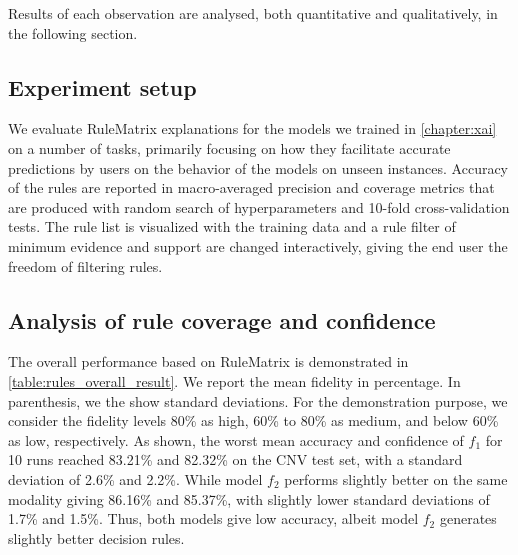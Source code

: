 \hspace*{3.5mm} Results of each observation are analysed, both quantitative and qualitatively, in the following section.

\subsection{Experiment setup}
We evaluate RuleMatrix explanations for the models we trained in \cref{chapter:xai} on a number of tasks, primarily focusing on how they facilitate accurate predictions by users on the behavior of the models on unseen instances. 
Accuracy of the rules are reported in macro-averaged precision and coverage metrics that are produced with random search of hyperparameters and 10-fold cross-validation tests. The rule list is visualized with the training data and a rule filter of minimum evidence and support are changed interactively, giving the end user the freedom of filtering rules. 

\subsection{Analysis of rule coverage and confidence}
The overall performance based on RuleMatrix is demonstrated in \cref{table:rules_overall_result}. We report the mean fidelity in percentage. In parenthesis, we the show standard deviations. For the demonstration purpose, we consider the fidelity levels 80\% as high, 60\% to 80\% as medium, and below 60\% as low, respectively. As shown, the worst mean accuracy and confidence of $f_1$ for 10 runs reached 83.21\% and 82.32\% on the CNV test set, with a standard deviation of 2.6\% and 2.2\%. While model $f_2$ performs slightly better on the same modality giving 86.16\% and 85.37\%, with slightly lower standard deviations of 1.7\% and 1.5\%. Thus, both models give low accuracy, albeit model $f_2$ generates slightly better decision rules. 

